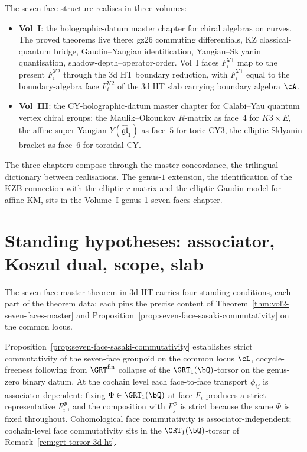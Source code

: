 The seven-face structure realises in three volumes:
\begin{itemize}
\item \textbf{Vol~I}: the holographic-datum master chapter for
 chiral algebras on curves. The proved theorems live there:
 gz26 commuting differentials, KZ classical-quantum bridge,
 Gaudin--Yangian identification, Yangian--Sklyanin
 quantisation, shadow-depth--operator-order. Vol~I faces
 $F_i^{\mathrm{V1}}$ map to the present
 $F_i^{\mathrm{V2}}$ through the 3d HT boundary reduction,
 with $F_i^{\mathrm{V1}}$ equal to the boundary-algebra face
 $F_i^{\mathrm{V2}}$ of the 3d HT slab carrying boundary
 algebra $\cA$.
\item \textbf{Vol~III}: the CY-holographic-datum master chapter
 for Calabi--Yau quantum vertex chiral groups; the
 Maulik--Okounkov $R$-matrix as face~$4$ for $K3\times E$, the
 affine super Yangian $Y(\widehat{\mathfrak{gl}}_1)$ as
 face~$5$ for toric CY3, the elliptic Sklyanin bracket as
 face~$6$ for toroidal CY.
\end{itemize}

The three chapters compose through the master concordance, the
trilingual dictionary between realisations. The genus-$1$
extension, the identification of the KZB connection with the
elliptic $r$-matrix and the elliptic Gaudin model for affine
KM, sits in the Volume~I genus-1 seven-faces chapter.

\section{Standing hypotheses: associator, Koszul dual, scope, slab}
\label{sec:dnp-master-hypotheses}

The seven-face master theorem in 3d HT carries four standing
conditions, each part of the theorem data; each pins the precise
content of Theorem~\ref{thm:vol2-seven-faces-master} and
Proposition~\ref{prop:seven-face-sasaki-commutativity} on the
common locus.

\begin{remark}
\label{rem:dnp-master-associator-dichotomy}
Proposition~\ref{prop:seven-face-sasaki-commutativity} establishes
strict commutativity of the seven-face groupoid on the common
locus $\cL$, cocycle-freeness following from
$\GRT^{\mathrm{fin}}$ collapse of the $\GRT_1(\bQ)$-torsor on the
genus-zero binary datum. At the cochain level each face-to-face
transport $\phi_{ij}$ is associator-dependent: fixing
$\Phi\in \GRT_1(\bQ)$ at face $F_i$ produces a strict
representative $F_i^{\Phi}$, and the composition with $F_j^{\Phi}$
is strict because the same $\Phi$ is fixed throughout. Cohomological
face commutativity is associator-independent; cochain-level face
commutativity sits in the $\GRT_1(\bQ)$-torsor of
Remark~\ref{rem:grt-torsor-3d-ht}.
\end{remark}

